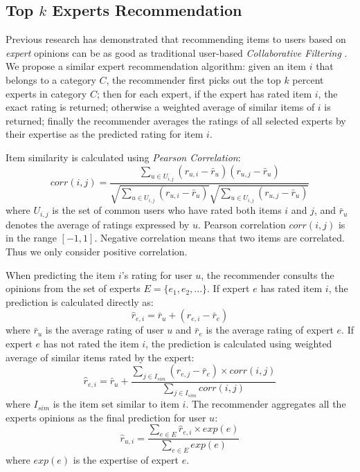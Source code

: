 \documentclass[12pt]{article}
\begin{document}

\subsection{Top $k$ Experts Recommendation} %
\label{sub:expert_recommendation}

Previous research has demonstrated that recommending items to users based on \emph{expert} opinions can be as good as traditional user-based \emph{Collaborative Filtering} \cite{Amatriain:2009p101}. We propose a similar expert recommendation algorithm: given an item $i$ that belongs to a category $C$, the recommender first picks out the top $k$ percent experts in category $C$; then for each expert, if the expert has rated item $i$, the exact rating is returned; otherwise a weighted average of similar items of $i$ is returned; finally the recommender averages the ratings of all selected experts by their expertise as the predicted rating for item $i$. 

Item similarity is calculated using \emph{Pearson Correlation}:
\begin{equation}
	corr(i,j) = \frac{\sum_{u \in U_{i,j}} (r_{u,i} - \bar{r}_u)(r_{u,j} - \bar{r}_u)} {{\sqrt{\sum_{u \in U_{i,j}} (r_{u,i} - \bar{r}_u)}} \sqrt{\sum_{u \in U_{i,j}} (r_{u,j} - \bar{r}_u)}}
\end{equation}
where $U_{i,j}$ is the set of common users who have rated both items $i$ and $j$, and $\bar{r}_u$ denotes the average of ratings expressed by $u$. Pearson correlation $corr(i,j)$ is in the range $[-1,1]$. Negative correlation means that two items are correlated. Thus we only consider positive correlation.

When predicting the item $i$'s rating for user $u$, the recommender consults the opinions from the set of experts $E = \{e_1, e_2, ...\}$. If expert $e$ has rated item $i$, the prediction is calculated directly as:
\begin{equation}
	\hat{r}_{e,i} = \bar{r}_u + (r_{e,i} - \bar{r}_e)
\end{equation}
where $\bar{r}_u$ is the average rating of user $u$ and $\bar{r}_e$ is the average rating of expert $e$. If expert $e$ has not rated the item $i$, the prediction is calculated using weighted average of similar items rated by the expert:
\begin{equation}
	\hat{r}_{e,i} = \bar{r}_u + \frac{\sum_{j \in I_{sim}} (r_{e,j} - \bar{r}_e) \times corr(i,j)} {\sum_{j \in I_{sim}} corr(i,j)}
\end{equation}
where $I_{sim}$ is the item set similar to item $i$. The recommender aggregates all the experts opinions as the final prediction for user $u$:
\begin{equation}
	\hat{r}_{u,i} = \frac{ \sum_{e \in E} \hat{r}_{e,i} \times exp(e) } { \sum_{e \in E} exp(e) }
\end{equation}
where $exp(e)$ is the expertise of expert $e$.
\end{document}
